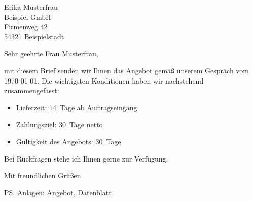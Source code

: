 \documentclass[11pt,fromalign=right,fromphone=true,fromemail=true,parskip=half]{scrlttr2}
\begin{document}
\begin{letter}{%
  Erika Musterfrau\\
  Beispiel GmbH\\
  Firmenweg 42\\
  54321 Beispielstadt%
}


\opening{Sehr geehrte Frau Musterfrau,}

mit diesem Brief senden wir Ihnen das Angebot gemäß unserem Gespräch vom
\today. Die wichtigsten Konditionen haben wir nachstehend zusammengefasst:

\begin{itemize}
  \item Lieferzeit: 14~Tage ab Auftragseingang
  \item Zahlungsziel: 30~Tage netto
  \item Gültigkeit des Angebots: 30~Tage
\end{itemize}

Bei Rückfragen stehe ich Ihnen gerne zur Verfügung.

\closing{Mit freundlichen Grüßen}

\ps{Anlagen: Angebot, Datenblatt}

\end{letter}
\end{document}
